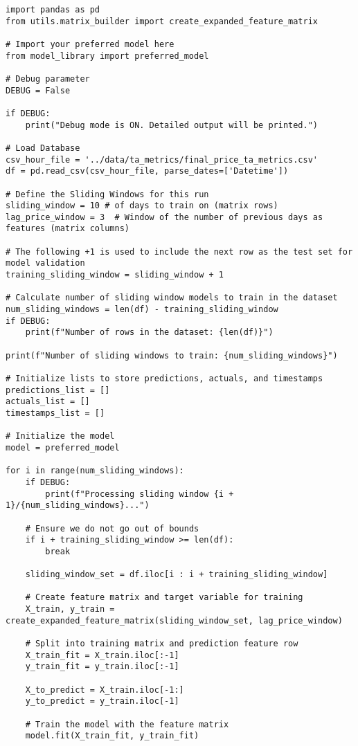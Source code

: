 \documentclass[12pt]{report} %
\begin{document}
\begin{lstlisting}
import pandas as pd
from utils.matrix_builder import create_expanded_feature_matrix

# Import your preferred model here
from model_library import preferred_model

# Debug parameter
DEBUG = False

if DEBUG:
    print("Debug mode is ON. Detailed output will be printed.")

# Load Database
csv_hour_file = '../data/ta_metrics/final_price_ta_metrics.csv'
df = pd.read_csv(csv_hour_file, parse_dates=['Datetime'])

# Define the Sliding Windows for this run
sliding_window = 10 # of days to train on (matrix rows)
lag_price_window = 3  # Window of the number of previous days as features (matrix columns)

# The following +1 is used to include the next row as the test set for model validation
training_sliding_window = sliding_window + 1

# Calculate number of sliding window models to train in the dataset
num_sliding_windows = len(df) - training_sliding_window
if DEBUG:
    print(f"Number of rows in the dataset: {len(df)}")

print(f"Number of sliding windows to train: {num_sliding_windows}")

# Initialize lists to store predictions, actuals, and timestamps
predictions_list = []
actuals_list = []
timestamps_list = []

# Initialize the model
model = preferred_model

for i in range(num_sliding_windows):
    if DEBUG:
        print(f"Processing sliding window {i + 1}/{num_sliding_windows}...")

    # Ensure we do not go out of bounds
    if i + training_sliding_window >= len(df):
        break
    
    sliding_window_set = df.iloc[i : i + training_sliding_window]
    
    # Create feature matrix and target variable for training
    X_train, y_train = create_expanded_feature_matrix(sliding_window_set, lag_price_window)
    
    # Split into training matrix and prediction feature row
    X_train_fit = X_train.iloc[:-1]
    y_train_fit = y_train.iloc[:-1]

    X_to_predict = X_train.iloc[-1:]
    y_to_predict = y_train.iloc[-1]

    # Train the model with the feature matrix
    model.fit(X_train_fit, y_train_fit)


\end{lstlisting}
\end{document}
